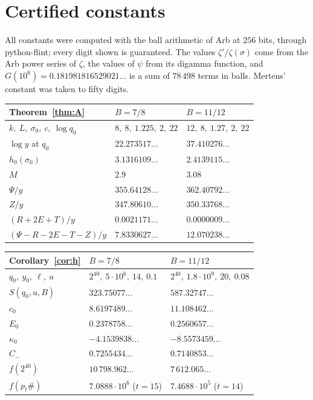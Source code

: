 \documentclass[11pt]{amsart}
\theoremstyle{definition}
\theoremstyle{remark}
\numberwithin{equation}{section}
\begin{document}
\section{Certified constants}\label{app:numerics}

All constants were computed with the ball arithmetic of Arb \cite{Joh17} at $256$ bits, through python-flint; every digit shown is guaranteed. The values $\zeta'/\zeta(\sigma)$ come from the Arb power series of $\zeta$, the values of $\psi$ from its digamma function, and $G(10^6)=0.181981816529021\ldots$ is a sum of $78\,498$ terms in balls. Mertens' constant was taken to fifty digits.

\begin{center}
\begin{tabular}{@{}lll@{}}
\toprule
Theorem~\ref{thm:A} & $B=7/8$ & $B=11/12$\\
\midrule
$k,\ L,\ \sigma_0,\ c,\ \log q_0$ & $8,\ 8,\ 1.225,\ 2,\ 22$ & $12,\ 8,\ 1.27,\ 2,\ 22$\\
$\log y$ at $q_0$ & $22.273517\ldots$ & $37.410276\ldots$\\
$h_0(\sigma_0)$ & $3.1316109\ldots$ & $2.4139115\ldots$\\
$M$ & $2.9$ & $3.08$\\
$\Psi/y$ & $355.64128\ldots$ & $362.40792\ldots$\\
$Z/y$ & $347.80610\ldots$ & $350.33768\ldots$\\
$(R+2E+T)/y$ & $0.0021171\ldots$ & $0.0000009\ldots$\\
$(\Psi-R-2E-T-Z)/y$ & $7.8330627\ldots$ & $12.070238\ldots$\\
\bottomrule
\end{tabular}

\medskip
\begin{tabular}{@{}lll@{}}
\toprule
Corollary~\ref{cor:h} & $B=7/8$ & $B=11/12$\\
\midrule
$q_0,\ y_0,\ \ell,\ u$ & $2^{40},\ 5\cdot10^6,\ 14,\ 0.1$ & $2^{40},\ 1.8\cdot10^9,\ 20,\ 0.08$\\
$S(q_0,u,B)$ & $323.75077\ldots$ & $587.32747\ldots$\\
$c_0$ & $8.6197489\ldots$ & $11.108462\ldots$\\
$E_0$ & $0.2378758\ldots$ & $0.2560657\ldots$\\
$\kappa_0$ & $-4.1539838\ldots$ & $-8.5573459\ldots$\\
$C_-$ & $0.7255434\ldots$ & $0.7140853\ldots$\\
$f(2^{40})$ & $10\,798.962\ldots$ & $7\,612.065\ldots$\\
$f(p_t\#)$ & $7.0888\cdot10^6$ ($t=15$) & $7.4688\cdot10^5$ ($t=14$)\\
\bottomrule
\end{tabular}
\end{center}
\end{document}
